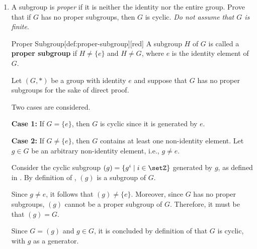 \begin{enumerate}
\begin{subprove}
    To show that $(g^d) \subseteq H$, since $g^d \in H$ and $H$ is a subgroup, 
    it follows by closure under the group operation that $(g^d) = \{(g^d)^i \mid i \in \setZ\} \subseteq H$.
    
    Therefore, $H = (g^d)$, and hence $H$ is cyclic by definition of .
    
    In both cases, it is shown that $H$ is cyclic.
    Since $H$ was an arbitrary subgroup of $G$, it follows that every subgroup of $G$ is cyclic.
  \end{subprove}





  \newpage
  
  \item A subgroup is \textit{proper} if it is neither the identity 
  nor the entire group. Prove that if $G$ has no proper subgroups, 
  then $G$ is cyclic. \textit{Do not assume that $G$ is finite}.
  \begin{define}{Proper Subgroup}[def:proper-subgroup][red]
    A subgroup $H$ of $G$ is called a \textbf{proper subgroup} if $H \neq \{e\}$ and $H \neq G$, 
    where $e$ is the identity element of $G$.
  \end{define}
  \begin{subprove}
    Let $(G, *)$ be a group with identity $e$ and suppose that $G$ has no proper subgroups for the sake of direct proof.
    
    Two cases are considered.
    
    \textbf{Case 1:} If $G = \{e\}$, then $G$ is cyclic since it is generated by $e$.
    
    \textbf{Case 2:} If $G \neq \{e\}$, then $G$ contains at least one non-identity element.
    Let $g \in G$ be an arbitrary non-identity element, i.e., $g \neq e$.
    
    Consider the cyclic subgroup $(g) = \{g^i \mid i \in \setZ\}$ generated by $g$, 
    as defined in .
    By definition of , $(g)$ is a subgroup of $G$.
    
    Since $g \neq e$, it follows that $(g) \neq \{e\}$.
    Moreover, since $G$ has no proper subgroups, $(g)$ cannot be a proper subgroup of $G$.
    Therefore, it must be that $(g) = G$.
    
    Since $G = (g)$ and $g \in G$, it is concluded by definition of  that $G$ is cyclic, 
    with $g$ as a generator.
    

\end{subprove}
\end{enumerate}

